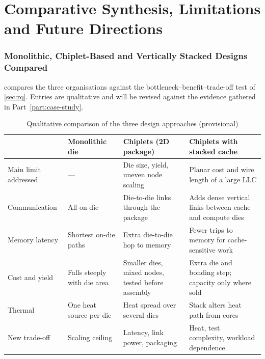 \clearpage
\part{Comparative Synthesis, Limitations and Future Directions}
\label{part:synthesis}

\section{Monolithic, Chiplet-Based and Vertically Stacked Designs Compared}
\label{sec:comparison}

 compares the three organisations against the bottleneck--benefit--trade-off test of \cref{sec:rq}. Entries are qualitative and will be revised against the evidence gathered in Part~\ref{part:case-study}.

\begin{table}[htbp]
  \centering
  \caption{Qualitative comparison of the three design approaches (provisional)}
  \label{tab:three-way}
  \small
  \begin{tabularx}{\textwidth}{@{}>{\raggedright\arraybackslash}p{2.6cm}>{\raggedright\arraybackslash}X>{\raggedright\arraybackslash}X>{\raggedright\arraybackslash}X@{}}
    \toprule
    & \textbf{Monolithic die} & \textbf{Chiplets (2D package)} & \textbf{Chiplets with stacked cache} \\
    \midrule
    Main limit addressed & --- & Die size, yield, uneven node scaling & Planar cost and wire length of a large LLC \\
    Communication & All on-die & Die-to-die links through the package & Adds dense vertical links between cache and compute dies \\
    Memory latency & Shortest on-die paths & Extra die-to-die hop to memory & Fewer trips to memory for cache-sensitive work \\
    Cost and yield & Falls steeply with die area & Smaller dies, mixed nodes, tested before assembly & Extra die and bonding step; capacity only where sold \\
    Thermal & One heat source per die & Heat spread over several dies & Stack alters heat path from cores \\
    New trade-off & Scaling ceiling & Latency, link power, packaging & Heat, test complexity, workload dependence \\
    \bottomrule
  \end{tabularx}
\end{table}


